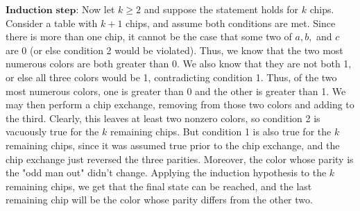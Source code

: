 $\textbf{Induction step:}$ Now let $k \geq 2$ and suppose the statement holds for $k$ chips. Consider a table with $k + 1$ chips, and assume both conditions are met.  Since there is more than one chip, it cannot be the case that some two of $a, b,$ and $c$ are 0 (or else condition 2 would be violated). Thus, we know that the two most numerous colors are both greater than 0. We also know that they are not both 1, or else all three colors would be 1, contradicting condition 1. Thus, of the two most numerous colors, one is greater than 0 and the other is greater than 1. We may then perform a chip exchange, removing from those two colors and adding to the third. Clearly, this leaves at least two nonzero colors, so condition 2 is vacuously true for the $k$ remaining chips. But condition 1 is also true for the $k$ remaining chips, since it was assumed true prior to the chip exchange, and the chip exchange just reversed the three parities. Moreover, the color whose parity is the "odd man out" didn't change. Applying the induction hypothesis to the $k$ remaining chips, we get that the final state can be reached, and the last remaining chip will be the color whose parity differs from the other two.